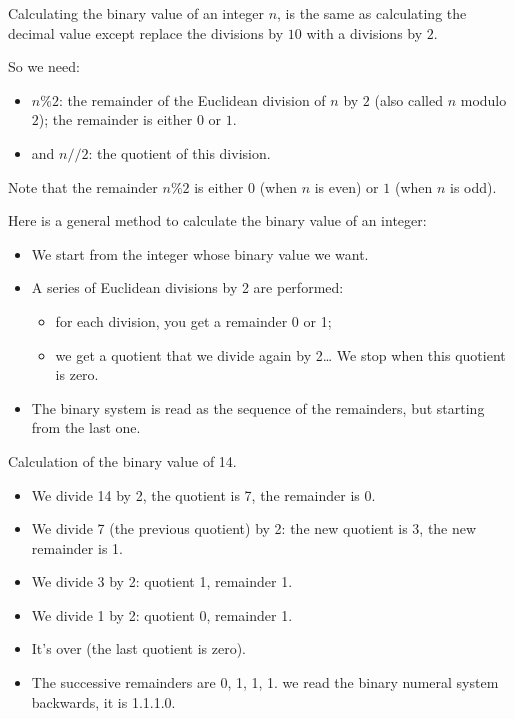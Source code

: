 \documentclass[11pt,class=report,crop=false]{standalone}
\begin{document}
\begin{cours}

Calculating the binary value of an integer $n$, is the same as calculating the decimal value except replace the divisions by $10$ with a divisions by $2$.

So we need:
  \begin{itemize}
    \item $n\%2$: the remainder of the Euclidean division of $n$ by $2$ (also called $n$ modulo $2$); the remainder is either $0$ or $1$.
    \item and $n//2$: the quotient of this division. 
  \end{itemize}
  
  Note that the remainder $n\%2$ is either $0$ (when $n$ is even) or $1$ (when $n$ is odd).
  
  Here is a general method to calculate the binary value of an integer:
\begin{itemize}
  \item We start from the integer whose binary value we want.
  
  \item A series of Euclidean divisions by 2 are performed: 
  \begin{itemize}
    \item for each division, you get a remainder 0 or 1; 
    \item we get a quotient that we divide again by 2\ldots{} We stop when this quotient is zero.
  \end{itemize}
  
  \item The binary system is read as the sequence of the remainders, but starting from the last one.
\end{itemize}

\begin{exemple}
Calculation of the binary value of 14.

\begin{itemize}
  \item We divide 14 by 2, the quotient is 7, the remainder is 0.
  \item We divide 7 (the previous quotient) by 2: the new quotient is 3, the new remainder is 1.
  \item We divide 3 by 2: quotient 1, remainder 1.
  \item We divide 1 by 2: quotient 0, remainder 1.
  \item It's over (the last quotient is zero).
  \item The successive remainders are 0, 1, 1, 1. we read the binary numeral system backwards, it is 1.1.1.0.  
\end{itemize}


\end{exemple}
\end{cours}
\end{document}
